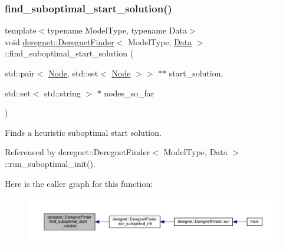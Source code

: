 \subsubsection{\texorpdfstring{find\+\_\+suboptimal\+\_\+start\+\_\+solution()}{find\_suboptimal\_start\_solution()}\hspace{0.1cm}{\footnotesize\ttfamily [1/3]}}
{\footnotesize\ttfamily template$<$typename Model\+Type, typename Data$>$ \\
void \hyperlink{classderegnet_1_1DeregnetFinder}{deregnet\+::\+Deregnet\+Finder}$<$ Model\+Type, \hyperlink{avgdrgnt_8cpp_a1d1235306db276e9b36acba1db1509e8}{Data} $>$\+::find\+\_\+suboptimal\+\_\+start\+\_\+solution (\begin{DoxyParamCaption}\item[{std\+::pair$<$ \hyperlink{namespacederegnet_a744bad34f2de9856d36715a445f027f3}{Node}, std\+::set$<$ \hyperlink{namespacederegnet_a744bad34f2de9856d36715a445f027f3}{Node} $>$$>$ $\ast$$\ast$}]{start\+\_\+solution,  }\item[{std\+::set$<$ std\+::string $>$ $\ast$}]{nodes\+\_\+so\+\_\+far }\end{DoxyParamCaption})}



Finds a heuristic suboptimal start solution. 



Referenced by deregnet\+::\+Deregnet\+Finder$<$ Model\+Type, Data $>$\+::run\+\_\+suboptimal\+\_\+init().

Here is the caller graph for this function\+:\nopagebreak
\begin{figure}[H]
\begin{center}
\leavevmode
\includegraphics[width=350pt]{classderegnet_1_1DeregnetFinder_a85fcde1dddbfd03ffc4ae8d244b4fc72_icgraph}
\end{center}
\end{figure}
\mbox{\label{classderegnet_1_1DeregnetFinder_a42eca7055ed54197e27df7bd70271a13}} 
